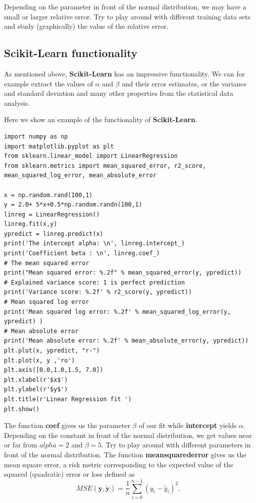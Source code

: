 \documentclass[%
oneside,                 %
final,                   %
10pt]{article}
\begin{document}
Depending on the parameter in front of the normal distribution, we may
have a small or larger relative error. Try to play around with
different training data sets and study (graphically) the value of the
relative error.

\subsection*{\textbf{Scikit-Learn} functionality}


As mentioned above, \textbf{Scikit-Learn} has an impressive functionality.
We can for example extract the values of $\alpha$ and $\beta$ and
their error estimates, or the variance and standard deviation and many
other properties from the statistical data analysis. 


Here we show an
example of the functionality of \textbf{Scikit-Learn}.
\begin{verbatim}
import numpy as np 
import matplotlib.pyplot as plt 
from sklearn.linear_model import LinearRegression 
from sklearn.metrics import mean_squared_error, r2_score, mean_squared_log_error, mean_absolute_error

x = np.random.rand(100,1)
y = 2.0+ 5*x+0.5*np.random.randn(100,1)
linreg = LinearRegression()
linreg.fit(x,y)
ypredict = linreg.predict(x)
print('The intercept alpha: \n', linreg.intercept_)
print('Coefficient beta : \n', linreg.coef_)
# The mean squared error                               
print("Mean squared error: %.2f" % mean_squared_error(y, ypredict))
# Explained variance score: 1 is perfect prediction                                 
print('Variance score: %.2f' % r2_score(y, ypredict))
# Mean squared log error                                                        
print('Mean squared log error: %.2f' % mean_squared_log_error(y, ypredict) )
# Mean absolute error                                                           
print('Mean absolute error: %.2f' % mean_absolute_error(y, ypredict))
plt.plot(x, ypredict, "r-")
plt.plot(x, y ,'ro')
plt.axis([0.0,1.0,1.5, 7.0])
plt.xlabel(r'$x$')
plt.ylabel(r'$y$')
plt.title(r'Linear Regression fit ')
plt.show()

\end{verbatim}
The function \textbf{coef} gives us the parameter $\beta$ of our fit while \textbf{intercept} yields 
$\alpha$. Depending on the constant in front of the normal distribution, we get values near or far from $alpha =2$ and $\beta =5$. Try to play around with different parameters in front of the normal distribution. The function \textbf{meansquarederror} gives us the mean square error, a risk metric corresponding to the expected value of the squared (quadratic) error or loss defined as
\[ MSE(\bm{y},\bm{\tilde{y}}) = \frac{1}{n}
\sum_{i=0}^{n-1}(y_i-\tilde{y}_i)^2, 
\] 
\end{document}
